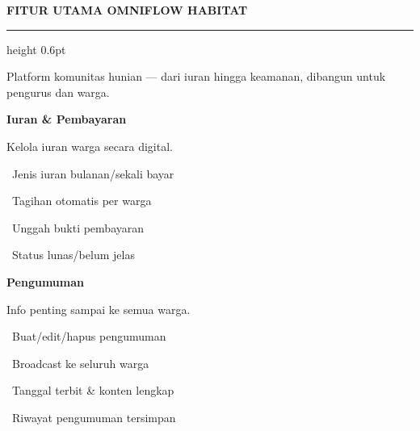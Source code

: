 \documentclass[a4paper]{article}
\newcommand{\sectiontitle}[1]{%
    \vspace{10pt}%
    {\fontsize{13}{16}\selectfont\bfseries\color{BlueDark} #1}\par\vspace{3pt}%
    {\color{BluePrimary}\hrule height 0.6pt}\par\vspace{8pt}%
}
\begin{document}
\sectiontitle{FITUR UTAMA OMNIFLOW HABITAT}

{\fontsize{9.5}{13}\selectfont\color{TextLight} Platform komunitas hunian --- dari iuran hingga keamanan, dibangun untuk pengurus dan warga.}

\vspace{6pt}

\noindent
\begin{minipage}[t]{0.485\textwidth}
    \colorbox{BluePrimary}{%
        \begin{minipage}{\dimexpr\textwidth-2\fboxsep\relax}
            {\fontsize{10}{13}\selectfont\bfseries\color{White} Iuran \& Pembayaran}
        \end{minipage}}\par
    \vspace{4pt}
    {\fontsize{9}{12}\selectfont\color{TextDark}%
    Kelola iuran warga secara digital.\par\vspace{3pt}
    \textbullet\ Jenis iuran bulanan/sekali bayar\par\vspace{2pt}%
    \textbullet\ Tagihan otomatis per warga\par\vspace{2pt}%
    \textbullet\ Unggah bukti pembayaran\par\vspace{2pt}%
    \textbullet\ Status lunas/belum jelas}%

\end{minipage}%
\hfill
\begin{minipage}[t]{0.485\textwidth}
    \colorbox{EmeraldPrimary}{%
        \begin{minipage}{\dimexpr\textwidth-2\fboxsep\relax}
            {\fontsize{10}{13}\selectfont\bfseries\color{White} Pengumuman}
        \end{minipage}}\par
    \vspace{4pt}
    {\fontsize{9}{12}\selectfont\color{TextDark}%
    Info penting sampai ke semua warga.\par\vspace{3pt}
    \textbullet\ Buat/edit/hapus pengumuman\par\vspace{2pt}%
    \textbullet\ Broadcast ke seluruh warga\par\vspace{2pt}%
    \textbullet\ Tanggal terbit \& konten lengkap\par\vspace{2pt}%
    \textbullet\ Riwayat pengumuman tersimpan}%

\end{minipage}
\end{document}
